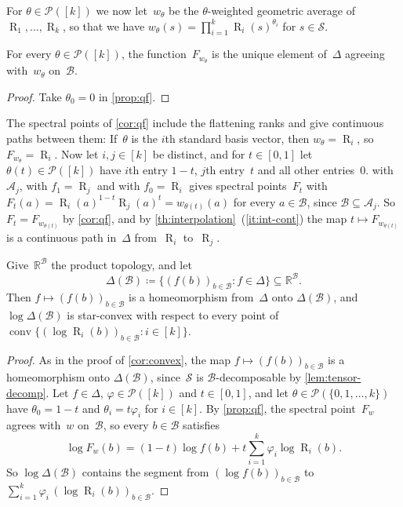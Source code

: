 \documentclass[11pt,letterpaper]{article}
\DeclareMathOperator{\tensorrank}{R}
\newcommand{\RR}{\mathbb{R}}
\DeclareMathOperator{\conv}{conv}
\begin{document}
For $\theta \in \mathcal{P}([k])$ we now let~$w_\theta$ be the $\theta$-weighted geometric average of $\tensorrank_1, \ldots, \tensorrank_k$, so that we have $w_\theta(s) = \prod_{i=1}^k \tensorrank_i(s)^{\theta_i}$ for $s \in \mathcal{S}$.

\begin{corollary}\label{cor:qf}
For every $\theta \in \mathcal{P}([k])$, the function~$F_{w_\theta}$ is the unique element of~$\Delta$ agreeing with~$w_\theta$ on~$\mathcal{B}$.
\end{corollary}
\begin{proof}
Take $\theta_0 = 0$ in \cref{prop:qf}.
\end{proof}

The spectral points of \cref{cor:qf} include the flattening ranks and give continuous paths between them: If~$\theta$ is the $i$th standard basis vector, then $w_\theta = \tensorrank_i$, so $F_{w_\theta} = \tensorrank_i$. Now let $i, j \in [k]$ be distinct, and for $t \in [0,1]$ let $\theta(t) \in \mathcal{P}([k])$ have $i$th entry $1 - t$, $j$th entry~$t$ and all other entries~$0$.  with~$\mathcal{A}_j$, with $f_1 = \tensorrank_j$ and with $f_0 = \tensorrank_i$ gives spectral points~$F_t$ with $F_t(a) = \tensorrank_i(a)^{1-t} \tensorrank_j(a)^t = w_{\theta(t)}(a)$ for every $a \in \mathcal{B}$, since $\mathcal{B} \subseteq \mathcal{A}_j$. So $F_t = F_{w_{\theta(t)}}$ by \cref{cor:qf}, and by \cref{th:interpolation}~(\ref{it:int-cont}) the map $t \mapsto F_{w_{\theta(t)}}$ is a continuous path in~$\Delta$ from~$\tensorrank_i$ to~$\tensorrank_j$.

\begin{corollary}\label{cor:qf-star-convex}
Give~$\RR^{\mathcal{B}}$ the product topology, and let
\[
\Delta(\mathcal{B}) \coloneqq \{ (f(b))_{b \in \mathcal{B}} : f \in \Delta \} \subseteq \RR^{\mathcal{B}}.
\]
Then $f \mapsto (f(b))_{b \in \mathcal{B}}$ is a homeomorphism from~$\Delta$ onto $\Delta(\mathcal{B})$, and $\log \Delta(\mathcal{B})$ is star-convex with respect to every point of $\conv\{ (\log \tensorrank_i(b))_{b \in \mathcal{B}} : i \in [k] \}$.
\end{corollary}
\begin{proof}
As in the proof of \cref{cor:convex}, the map $f \mapsto (f(b))_{b \in \mathcal{B}}$ is a homeomorphism onto $\Delta(\mathcal{B})$, since~$\mathcal{S}$ is $\mathcal{B}$-decomposable by \cref{lem:tensor-decomp}. Let $f \in \Delta$, $\varphi \in \mathcal{P}([k])$ and $t \in [0,1]$, and let $\theta \in \mathcal{P}(\{0, 1, \ldots, k\})$ have $\theta_0 = 1 - t$ and $\theta_i = t \varphi_i$ for $i \in [k]$. By \cref{prop:qf}, the spectral point~$F_w$ agrees with~$w$ on~$\mathcal{B}$, so every $b \in \mathcal{B}$ satisfies
\[
\log F_w(b) = (1-t) \log f(b) + t \sum_{i=1}^k \varphi_i \log \tensorrank_i(b).
\]
So $\log \Delta(\mathcal{B})$ contains the segment from $(\log f(b))_{b \in \mathcal{B}}$ to $\sum_{i=1}^k \varphi_i\, (\log \tensorrank_i(b))_{b \in \mathcal{B}}$.
\end{proof}
\end{document}
